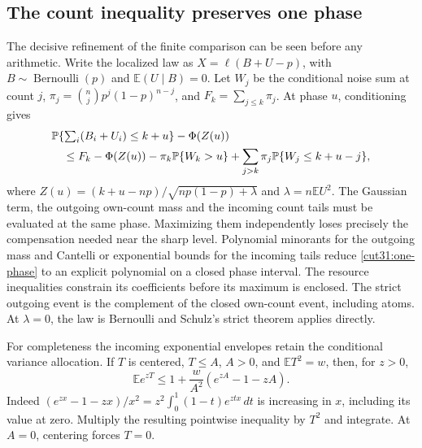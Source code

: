 \documentclass[11pt,a4paper]{article}
\numberwithin{equation}{section}
\theoremstyle{definition}
\theoremstyle{remark}
\newcommand{\E}{\mathbb E}
\newcommand{\Pp}{\mathbb P}
\begin{document}
\subsection{The count inequality preserves one phase}
The decisive refinement of the finite comparison can be seen
before any arithmetic. Write the localized law as
\(X=\ell(B+U-p)\), with \(B\sim\operatorname{Bernoulli}(p)\) and
\(\E(U\mid B)=0\). Let \(W_j\) be the conditional noise sum
at count \(j\), \(\pi_j=\binom njp^j(1-p)^{n-j}\), and
\(F_k=\sum_{j\le k}\pi_j\). At phase \(u\), conditioning gives
\begin{align}\label{cut31:one-phase}
 &\Pp\{\textstyle\sum_i(B_i+U_i)\le k+u\}-\Phi(Z(u))\notag\\
 &\quad\le F_k-\Phi(Z(u))-\pi_k\Pp\{W_k>u\}
       +\sum_{j>k}\pi_j\Pp\{W_j\le k+u-j\},
\end{align}
where \(Z(u)=(k+u-np)/\sqrt{np(1-p)+\lambda}\) and
\(\lambda=n\E U^2\).
The Gaussian term, the outgoing own-count mass and the incoming
count tails must be evaluated at the same phase. Maximizing them
independently loses precisely the compensation needed near the
sharp level. Polynomial minorants for the outgoing mass and
Cantelli or exponential bounds for the incoming tails reduce
\eqref{cut31:one-phase} to an explicit polynomial on a closed
phase interval. The resource inequalities constrain its
coefficients before its maximum is enclosed.
The strict outgoing event is the complement of the closed
own-count event, including atoms. At \(\lambda=0\), the law is
Bernoulli and Schulz's strict theorem applies directly.

For completeness the incoming exponential envelopes retain the
conditional variance allocation. If \(T\) is centered, \(T\le A\),
\(A>0\), and \(\E T^2=w\), then, for \(z>0\),
\[
 \E e^{zT}\le1+\frac{w}{A^2}(e^{zA}-1-zA).
\]
Indeed
\((e^{zx}-1-zx)/x^2=z^2\int_0^1(1-t)e^{ztx}\,dt\)
is increasing in \(x\), including its value at zero.
Multiply the resulting pointwise inequality by \(T^2\) and integrate.
At \(A=0\), centering forces \(T=0\).
\end{document}
